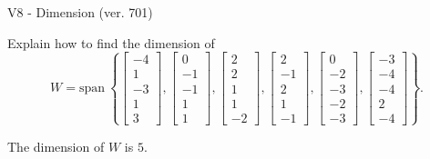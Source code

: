 \begin{exercise}
  \begin{exerciseTitle}V8 - Dimension (ver. 701)\end{exerciseTitle}
  \begin{exerciseStatement}
    Explain how to find the dimension of 
\[W=\mathrm{span}\ \left\{\left[\begin{array}{r}
-4 \\
1 \\
-3 \\
1 \\
3
\end{array}\right] , \left[\begin{array}{r}
0 \\
-1 \\
-1 \\
1 \\
1
\end{array}\right] , \left[\begin{array}{r}
2 \\
2 \\
1 \\
1 \\
-2
\end{array}\right] , \left[\begin{array}{r}
2 \\
-1 \\
2 \\
1 \\
-1
\end{array}\right] , \left[\begin{array}{r}
0 \\
-2 \\
-3 \\
-2 \\
-3
\end{array}\right] , \left[\begin{array}{r}
-3 \\
-4 \\
-4 \\
2 \\
-4
\end{array}\right]\right\}.\]



  \end{exerciseStatement}
  \begin{exerciseAnswer}
   The dimension of \(W\) is  \(5\).
  


  \end{exerciseAnswer}
\end{exercise}